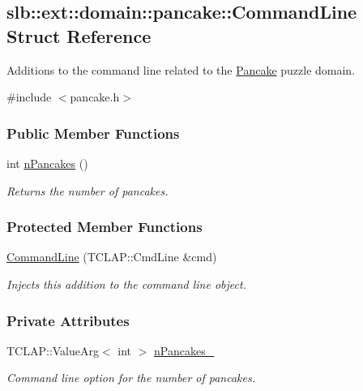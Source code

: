 \hypertarget{structslb_1_1ext_1_1domain_1_1pancake_1_1CommandLine}{}\subsection{slb\+:\+:ext\+:\+:domain\+:\+:pancake\+:\+:Command\+Line Struct Reference}
\label{structslb_1_1ext_1_1domain_1_1pancake_1_1CommandLine}


Additions to the command line related to the \hyperlink{structslb_1_1ext_1_1domain_1_1pancake_1_1Pancake}{Pancake} puzzle domain.  




{\ttfamily \#include $<$pancake.\+h$>$}

\subsubsection*{Public Member Functions}
\begin{DoxyCompactItemize}
\item 
int \hyperlink{structslb_1_1ext_1_1domain_1_1pancake_1_1CommandLine_a693fc7f35c65bd739aa1788533117df0}{n\+Pancakes} ()
\begin{DoxyCompactList}\small\item\em Returns the number of pancakes. \end{DoxyCompactList}\end{DoxyCompactItemize}
\subsubsection*{Protected Member Functions}
\begin{DoxyCompactItemize}
\item 
\hyperlink{structslb_1_1ext_1_1domain_1_1pancake_1_1CommandLine_a3063971362d036945ea9724467a6ba36}{Command\+Line} (T\+C\+L\+A\+P\+::\+Cmd\+Line \&cmd)
\begin{DoxyCompactList}\small\item\em Injects this addition to the command line object. \end{DoxyCompactList}\end{DoxyCompactItemize}
\subsubsection*{Private Attributes}
\begin{DoxyCompactItemize}
\item 
T\+C\+L\+A\+P\+::\+Value\+Arg$<$ int $>$ \hyperlink{structslb_1_1ext_1_1domain_1_1pancake_1_1CommandLine_a7a73482a8683eddcd2fe7481853e7f21}{n\+Pancakes\+\_\+}\hypertarget{structslb_1_1ext_1_1domain_1_1pancake_1_1CommandLine_a7a73482a8683eddcd2fe7481853e7f21}{}\label{structslb_1_1ext_1_1domain_1_1pancake_1_1CommandLine_a7a73482a8683eddcd2fe7481853e7f21}

\begin{DoxyCompactList}\small\item\em Command line option for the number of pancakes. \end{DoxyCompactList}\end{DoxyCompactItemize}



